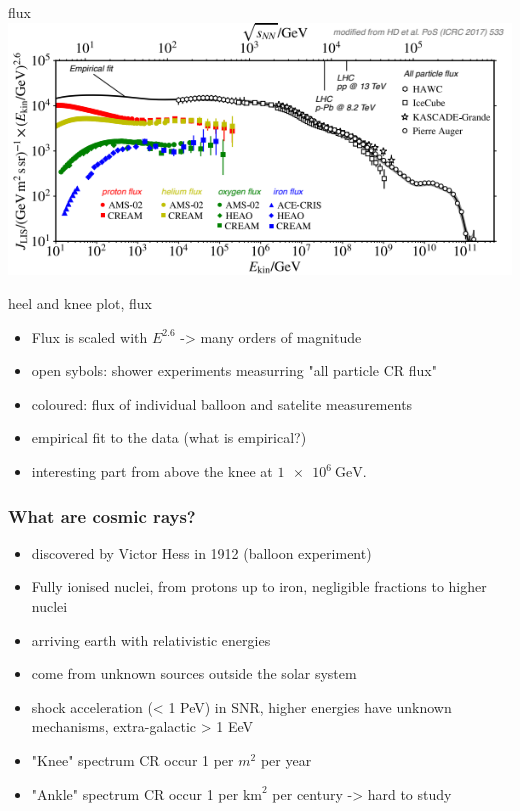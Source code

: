 \documentclass[aspectratio=1610, 9pt]{beamer}
\begin{document}
\begin{frame}{flux}
  \includegraphics[width=\textwidth]{knee_heel.png}
\end{frame}

\begin{frame}{heel and knee plot, flux}
  \begin{itemize}
    \item Flux is scaled with $E^{2.6}$ -> many orders of magnitude
    \item open sybols: shower experiments measurring "all particle CR flux"
    \item coloured: flux of individual balloon and satelite measurements
    \item empirical fit to the data (what is empirical?)
    \item interesting part from above the knee at $\SI{1e6}{\giga\electronvolt}$.
  \end{itemize}
\end{frame}

\begin{frame}\frametitle{What are cosmic rays?}
  \begin{itemize}
    \item discovered by Victor Hess in 1912 (balloon experiment)
    \item Fully ionised nuclei, from protons up to iron, negligible fractions
    to higher nuclei
    \item arriving earth with relativistic energies
    \item come from unknown sources outside the solar system
    \item shock acceleration (< 1 PeV) in SNR, higher energies have unknown
    mechanisms, extra-galactic > 1 EeV
    \item "Knee" spectrum CR occur 1 per $m^2$ per year
    \item "Ankle" spectrum CR occur 1 per $\text{km}^2$ per century -> hard to study
  \end{itemize}
\end{frame}
\end{document}
